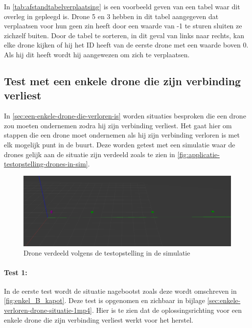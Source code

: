 \documentclass[a4paper, 11pt, oneside]{report}
\begin{document}
In \autoref{tab:afstandtabelverplaatsing} is een voorbeeld geven van een tabel waar dit overleg in gepleegd is. 
Drone 5 en 3 hebben in dit tabel aangegeven dat verplaatsen voor hun geen zin heeft door een waarde van -1 te sturen sluiten ze zichzelf buiten.
Door de tabel te sorteren, in dit geval van links naar rechts, kan elke drone kijken of hij het ID heeft van de eerste drone met een waarde boven 0. Als hij dit heeft wordt hij aangewezen om zich te verplaatsen.

\subsection{Test met een enkele drone die zijn verbinding verliest}

In \autoref{sec:een-enkele-drone-die-verloren-is} worden situaties besproken die een drone zou moeten ondernemen zodra hij zijn verbinding verliest. Het gaat hier om stappen die een drone moet ondernemen als hij zijn verbinding verloren is met elk mogelijk punt in de buurt.
Deze worden getest met een simulatie waar de drones gelijk aan de situatie zijn verdeeld zoals te zien in 	\autoref{fig:applicatie-testopstelling-drones-in-sim}.

\begin{figure}[H]
	\begin{center}\includegraphics[width=\linewidth]{Afbeeldingen/droneopstelling_in_sim.png}\end{center}
	\caption{Drone verdeeld volgens de testopstelling in de simulatie}
	\label{fig:applicatie-testopstelling-drones-in-sim}
\end{figure}
\paragraph{Test 1:} In de eerste test wordt de situatie nagebootst zoals deze wordt omschreven in \autoref{fig:enkel_B_kapot}.
Deze test is opgenomen en zichbaar in bijlage \ref{sec:enkele-verloren-drone-situatie-1mp4}. 
Hier is te zien dat de oplossingsrichting voor een enkele drone die zijn verbinding verliest werkt voor het herstel.
\end{document}
